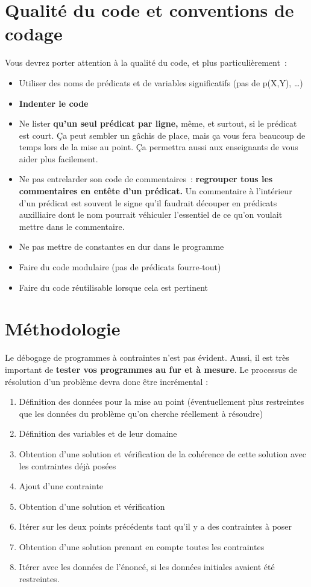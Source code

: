 \section*{Qualité du code et conventions de codage}
Vous devrez porter attention à la qualité du code, et plus particulièrement~:
\begin{itemize}
 \item Utiliser des noms de prédicats et de variables significatifs (pas de p(X,Y), \ldots)
 \item \textbf{Indenter le code} 
 \item Ne lister \textbf{qu'un seul prédicat par ligne,} même, et surtout, si
   le prédicat est court.  Ça peut sembler un gâchis de place, mais ça
   vous fera beaucoup de temps lors de la mise au point. Ça permettra
   aussi aux enseignants de vous aider plus facilement.
 \item Ne pas entrelarder son code de commentaires~: \textbf{regrouper tous les
   commentaires en entête d'un prédicat.} Un commentaire à
   l'intérieur d'un prédicat est souvent le signe qu'il faudrait
   découper en prédicats auxilliaire dont le nom pourrait véhiculer
   l'essentiel de ce qu'on voulait mettre dans le commentaire.
 \item Ne pas mettre de constantes en dur dans le programme
 \item Faire du code modulaire (pas de prédicats fourre-tout)
 \item Faire du code réutilisable lorsque cela est pertinent
\end{itemize}


\section*{Méthodologie}
Le débogage de programmes à contraintes n'est pas évident. Aussi, il
est très important de \textbf{tester vos programmes au fur et à
  mesure}.  Le processus de résolution d'un problème devra donc être
incrémental :
\begin{enumerate}
 \item Définition des données pour la mise au point (éventuellement
   plus restreintes que les données du problème qu'on cherche
   réellement à résoudre)
 \item Définition des variables et de leur domaine
 \item Obtention d'une solution et vérification de la cohérence de
   cette solution avec les contraintes déjà posées
 \item Ajout d'une contrainte 
 \item Obtention d'une solution et vérification
 \item Itérer sur les deux points précédents tant qu'il y a des
   contraintes à poser
 \item \label{une:sol} Obtention d'une solution prenant en compte toutes les
   contraintes
\item Itérer avec les données de l'énoncé, si les données initiales
  avaient été restreintes.\\
\end{enumerate}

